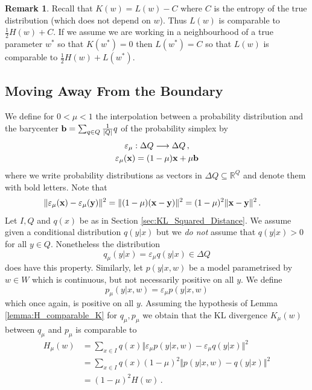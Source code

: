\documentclass[english,letter paper,12pt,reqno]{article}
\theoremstyle{definition}
\newtheorem{remark}[theorem]{Remark}
\newcommand{\lto}{\longrightarrow}
\begin{document}
\begin{remark} Recall that $K(w) = L(w) - C$ where $C$ is the entropy of the true distribution (which does not depend on $w$). Thus $L(w)$ is comparable to $\tfrac{1}{2} H(w) + C$. If we assume we are working in a neighbourhood of a true parameter $w^*$ so that $K(w^*) = 0$ then $L(w^*) = C$ so that $L(w)$ is comparable to $\tfrac{1}{2} H(w) + L(w^*)$.
\end{remark}

\subsection{Moving Away From the Boundary}\label{section:boundary_away}

We define for $0 < \mu < 1$ the interpolation between a probability distribution and the barycenter $\bold{b} = \sum_{q \in Q} \frac{1}{|Q|} q$ of the probability simplex by
\begin{gather*}
\varepsilon_\mu: \Delta Q \lto \Delta Q\,,\\
\varepsilon_\mu( \bold{x} ) = (1-\mu) \bold{x} + \mu \bold{b}
\end{gather*}
where we write probability distributions as vectors in $\Delta Q \subseteq \mathbb{R}^Q$ and denote them with bold letters. Note that
\begin{align*}
\Vert \varepsilon_\mu(\bold{x}) - \varepsilon_\mu(\bold{y}) \Vert^2 &= \Vert (1-\mu)(\bold{x} - \bold{y}) \Vert^2 = (1-\mu)^2 \Vert \bold{x} - \bold{y} \Vert^2\,.
\end{align*}
Let $I, Q$ and $q(x)$ be as in Section \ref{sec:KL_Squared_Distance}. We assume given a conditional distribution $q(y|x)$ but we \emph{do not} assume that $q(y|x) > 0$ for all $y \in Q$. Nonetheless the distribution
\[
q_\mu(y|x) = \varepsilon_\mu q(y|x) \in \Delta Q
\]
does have this property. Similarly, let $p(y|x,w)$ be a model parametrised by $w \in W$ which is continuous, but not necessarily positive on all $y$. We define
\[
p_\mu(y|x,w) = \varepsilon_\mu p(y|x,w)
\]
which once again, is positive on all $y$. Assuming the hypothesis of Lemma \ref{lemma:H_comparable_K} for $q_\mu, p_\mu$ we obtain that the KL divergence $K_\mu(w)$ between $q_\mu$ and $p_\mu$ is comparable to
\begin{align*}
H_\mu(w) &= \sum_{x \in I} q(x) \Vert \varepsilon_\mu p(y|x,w) - \varepsilon_\mu q(y|x) \Vert^2\\
&= \sum_{x \in I} q(x) (1-\mu)^2 \Vert p(y|x,w) - q(y|x) \Vert^2\\
&= (1-\mu)^2 H(w)\,.
\end{align*}
\end{document}
